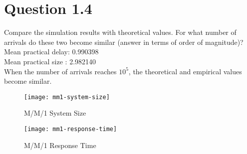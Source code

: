 \documentclass{article}
\newenvironment{homeworkProblem}[1]{
	\section*{#1}
	}{
}
\begin{document}

\begin{homeworkProblem}{Question 1.4}
Compare the simulation results with theoretical values. For what number of arrivals do these two become similar (answer in terms of order of magnitude)?\\

Mean practical delay: 0.990398\\
Mean practical size : 2.982140\\

When the number of arrivals reaches \textbf{$10^5$}, the theoretical and empirical values become similar.

\begin{figure}[H]
\begin{minipage}[t]{0.5\linewidth}
\centering
\texttt{[image: mm1-system-size]}
\caption{M/M/1 System Size}
\label{mm1-system-size}
\end{minipage}
\begin{minipage}[t]{0.5\linewidth}
\centering
\texttt{[image: mm1-response-time]}
\caption{M/M/1 Response Time}
\label{mm1-response-time}
\end{minipage}
\end{figure}

\end{homeworkProblem}

\end{document}
